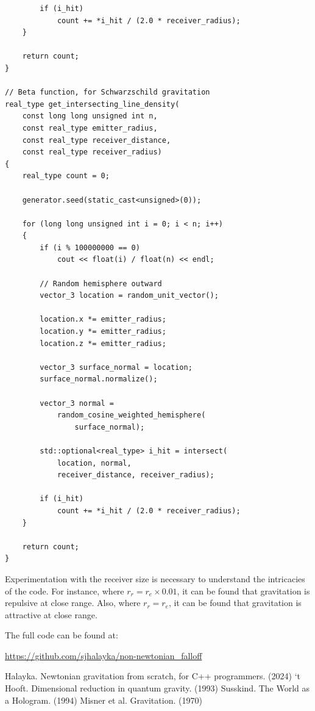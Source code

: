 \documentclass[12pt]{article}
\begin{document}
\begin{lstlisting}
		if (i_hit)
			count += *i_hit / (2.0 * receiver_radius);
	}

	return count;
}

// Beta function, for Schwarzschild gravitation
real_type get_intersecting_line_density(
	const long long unsigned int n,
	const real_type emitter_radius,
	const real_type receiver_distance,
	const real_type receiver_radius)
{
	real_type count = 0;

	generator.seed(static_cast<unsigned>(0));

	for (long long unsigned int i = 0; i < n; i++)
	{
		if (i % 100000000 == 0)
			cout << float(i) / float(n) << endl;

		// Random hemisphere outward
		vector_3 location = random_unit_vector();

		location.x *= emitter_radius;
		location.y *= emitter_radius;
		location.z *= emitter_radius;

		vector_3 surface_normal = location;
		surface_normal.normalize();

		vector_3 normal = 
			random_cosine_weighted_hemisphere(
				surface_normal);

		std::optional<real_type> i_hit = intersect(
			location, normal, 
			receiver_distance, receiver_radius);

		if (i_hit)
			count += *i_hit / (2.0 * receiver_radius);
	}

	return count;
}
\end{lstlisting}

Experimentation with the receiver size is necessary to understand the intricacies of the code.
For instance, where $r_{r} = r_{e} \times 0.01$, it can be found that gravitation is repulsive at close range.
Also, where $r_{r} = r_{e}$, it can be found that gravitation is attractive at close range.

The full code can be found at:

\url{https://github.com/sjhalayka/non-newtonian_falloff}












\begin{thebibliography}{9}


 Halayka. Newtonian gravitation from scratch, for C++ programmers. (2024)
 `t Hooft. Dimensional reduction in quantum gravity. (1993)
 Susskind. The World as a Hologram. (1994)
 Misner et al. Gravitation. (1970)

\end{thebibliography}
\end{document}
